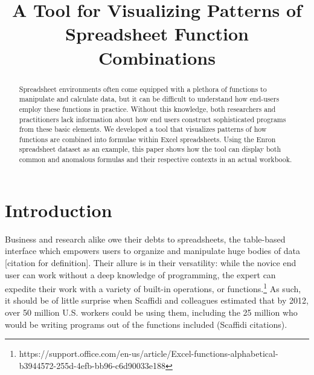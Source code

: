 \documentclass[conference]{IEEEtran}
\begin{document}
\title{A Tool for Visualizing Patterns of Spreadsheet Function Combinations}


\author{
}






\maketitle

\begin{abstract}
Spreadsheet environments often come equipped with a plethora of functions to manipulate and calculate data, but it can be difficult to understand how end-users employ these functions in practice. Without this knowledge, both researchers and practitioners lack information about how end users construct sophisticated programs from these basic elements. We developed a tool that visualizes patterns of how functions are combined into formulae within Excel spreadsheets. Using the Enron spreadsheet dataset as an example, this paper shows how the tool can display both common and anomalous formulas and their respective contexts in an actual workbook.
\end{abstract}





%
\IEEEpeerreviewmaketitle



\section{Introduction}
Business and research alike owe their debts to spreadsheets, the table-based interface which empowers users to organize and manipulate huge bodies of data [citation for definition]. Their allure is in their versatility: while the novice end user can work without a deep knowledge of programming, the expert can expedite their work with a variety of built-in operations, or functions.\footnote{https://support.office.com/en-us/article/Excel-functions-alphabetical-b3944572-255d-4efb-bb96-c6d90033e188} As such, it should be of little surprise when Scaffidi and colleagues estimated that by 2012, over 50 million U.S. workers could be using them, including the 25 million who would be writing programs out of the functions included (Scaffidi citations).\par
\end{document}
